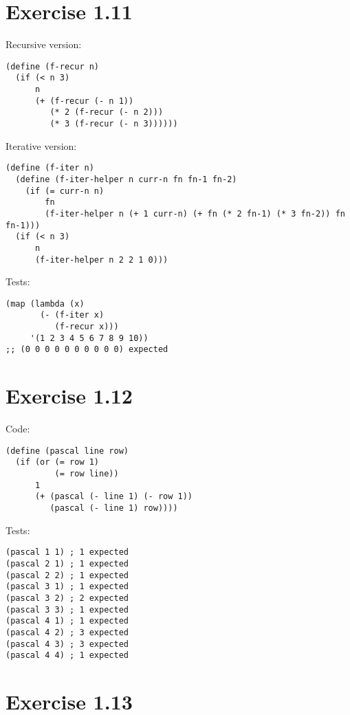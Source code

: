 \documentclass[../main.tex]{subfiles}
\begin{document}
\section{Exercise 1.11}

Recursive version:

\begin{lstlisting}
(define (f-recur n)
  (if (< n 3)
      n
      (+ (f-recur (- n 1))
         (* 2 (f-recur (- n 2)))
         (* 3 (f-recur (- n 3))))))
\end{lstlisting}

Iterative version:

\begin{lstlisting}
(define (f-iter n)
  (define (f-iter-helper n curr-n fn fn-1 fn-2)
    (if (= curr-n n)
        fn
        (f-iter-helper n (+ 1 curr-n) (+ fn (* 2 fn-1) (* 3 fn-2)) fn fn-1)))
  (if (< n 3)
      n
      (f-iter-helper n 2 2 1 0)))
\end{lstlisting}

Tests:

\begin{lstlisting}
(map (lambda (x)
       (- (f-iter x)
          (f-recur x)))
     '(1 2 3 4 5 6 7 8 9 10))
;; (0 0 0 0 0 0 0 0 0 0) expected
\end{lstlisting}

\section{Exercise 1.12}

Code:

\begin{lstlisting}
(define (pascal line row)
  (if (or (= row 1)
          (= row line))
      1
      (+ (pascal (- line 1) (- row 1))
         (pascal (- line 1) row))))
\end{lstlisting}

Tests:

\begin{lstlisting}
(pascal 1 1) ; 1 expected
(pascal 2 1) ; 1 expected
(pascal 2 2) ; 1 expected
(pascal 3 1) ; 1 expected
(pascal 3 2) ; 2 expected
(pascal 3 3) ; 1 expected
(pascal 4 1) ; 1 expected
(pascal 4 2) ; 3 expected
(pascal 4 3) ; 3 expected
(pascal 4 4) ; 1 expected
\end{lstlisting}

\section{Exercise 1.13}
\end{document}
